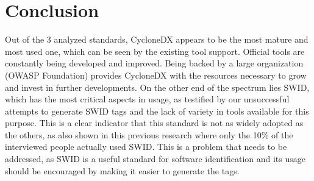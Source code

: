 \section{Conclusion}

Out of the 3 analyzed standards, CycloneDX appears to be the most mature and most used one, which can be seen by the existing tool support. Official tools are constantly being developed and improved. Being backed by a large organization (OWASP Foundation) provides CycloneDX with the resources necessary to grow and invest in further developments. On the other end of the spectrum lies SWID, which has the most critical aspects in usage, as testified by our unsuccessful attempts to generate SWID tags and the lack of variety in tools available for this purpose. This is a clear indicator that this standard is not as widely adopted as the others, as also shown in this previous research \cite{article:software-bom} where only the 10\% of the interviewed people actually used SWID.  This is a problem that needs to be addressed, as SWID is a useful standard for software identification and its usage should be encouraged by making it easier to generate the tags.
